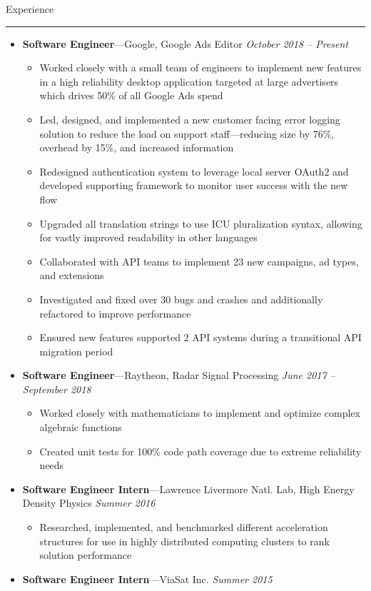 \documentclass[10pt,oneside]{article}
\newcommand{\sectitle}[1]{
  \begin{flushleft}{\selectfont\Large#1}\end{flushleft}
}
\newenvironment{ressection}[1]{
  \vspace{0pt}
  \sectitle{#1}
  \vspace{-10pt}\rule{\textwidth}{0.5pt}
  \vspace{-10pt}
  \begin{itemize}[leftmargin=13pt]
  \vspace{-2pt}
}{
  \end{itemize}
}
\newcommand{\ressubitem}[1]{
  \vspace{-1pt}
  \item[--] \begin{flushleft} #1 \end{flushleft}
}
\newcommand{\resbigitemline}[3]{
  \vspace{-1pt}
  \item
  \textbf{#1}---#2
  \hfill
  \textit{#3}
}
\newenvironment{ressubsecline}[3]{
  \resbigitemline{#1}{#2}{#3}
  \vspace{-2pt}
  \begin{itemize}
}{
  \end{itemize}
  \vspace{-2pt}
}
\begin{document}
\begin{ressection}{Experience}
  \begin{ressubsecline}{Software Engineer}{Google, Google Ads Editor}{October 2018 -- Present}
    \ressubitem{Worked closely with a small team of engineers to implement new features in a high reliability desktop application targeted at large advertisers which drives 50\% of all Google Ads spend}
    \ressubitem{Led, designed, and implemented a new customer facing error logging solution to reduce the load on support staff---reducing size by 76\%, overhead by 15\%, and increased information}
    \ressubitem{Redesigned authentication system to leverage local server OAuth2 and developed supporting framework to monitor user success with the new flow}
    \ressubitem{Upgraded all translation strings to use ICU pluralization syntax, allowing for vastly improved readability in other languages}
    \ressubitem{Collaborated with API teams to implement 23 new campaigns, ad types, and extensions}
    \ressubitem{Investigated and fixed over 30 bugs and crashes and additionally refactored to improve performance}
    \ressubitem{Ensured new features supported 2 API systems during a transitional API migration period}
  \end{ressubsecline}
  \begin{ressubsecline}{Software Engineer}{Raytheon, Radar Signal Processing}{June 2017 -- September 2018}
    \ressubitem{Worked closely with mathematicians to implement and optimize complex algebraic functions}
    \ressubitem{Created unit tests for 100\% code path coverage due to extreme reliability needs}
  \end{ressubsecline}
  \begin{ressubsecline}{Software Engineer Intern}{Lawrence Livermore Natl. Lab, High Energy Density Physics}{Summer 2016}
    \ressubitem{Researched, implemented, and benchmarked different acceleration structures for use in highly distributed computing clusters to rank solution performance}
  \end{ressubsecline}
  \resbigitemline{Software Engineer Intern}{ViaSat Inc.}{Summer 2015}
\end{ressection}
\end{document}
